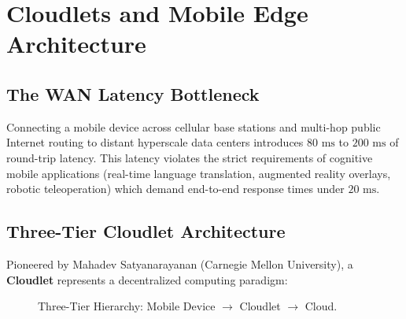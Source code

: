 \documentclass[11pt,a4paper,openany]{report}
\begin{document}
\section{Cloudlets and Mobile Edge Architecture}
\subsection{The WAN Latency Bottleneck}
Connecting a mobile device across cellular base stations and multi-hop public Internet routing to distant hyperscale data centers introduces $80\text{ ms}$ to $200\text{ ms}$ of round-trip latency. This latency violates the strict requirements of cognitive mobile applications (real-time language translation, augmented reality overlays, robotic teleoperation) which demand end-to-end response times under $20\text{ ms}$.

\subsection{Three-Tier Cloudlet Architecture}
Pioneered by Mahadev Satyanarayanan (Carnegie Mellon University), a \textbf{Cloudlet} represents a decentralized computing paradigm:
\begin{figure}[H]
\centering
{}
\caption{Three-Tier Hierarchy: Mobile Device $\to$ Cloudlet $\to$ Cloud.}
\end{figure}
\end{document}
